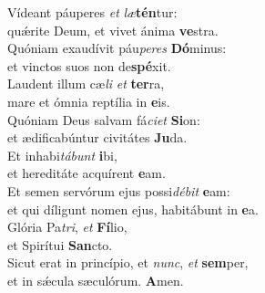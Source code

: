 \oddverse Vídeant páuperes \textit{et} \textit{læ}\textbf{tén}tur:~\*\\
\oddverse quǽrite Deum, et vivet ánima \textbf{ve}stra.\\
\evenverse Quóniam exaudívit páu\textit{pe}\textit{res} \textbf{Dó}minus:~\*\\
\evenverse et vinctos suos non de\textbf{spé}xit.\\
\oddverse Laudent illum cæ\textit{li} \textit{et} \textbf{ter}ra,~\*\\
\oddverse mare et ómnia reptília in \textbf{e}is.\\
\evenverse Quóniam Deus salvam fá\textit{ci}\textit{et} \textbf{Si}on:~\*\\
\evenverse et ædificabúntur civitátes \textbf{Ju}da.\\
\oddverse Et inhabi\textit{tá}\textit{bunt} \textbf{i}bi,~\*\\
\oddverse et hereditáte acquírent \textbf{e}am.\\
\evenverse Et semen servórum ejus possi\textit{dé}\textit{bit} \textbf{e}am:~\*\\
\evenverse et qui díligunt nomen ejus, habitábunt in \textbf{e}a.\\
\oddverse Glória Pa\textit{tri}, \textit{et} \textbf{Fí}lio,~\*\\
\oddverse et Spirítui \textbf{San}cto.\\
\evenverse Sicut erat in princípio, et \textit{nunc}, \textit{et} \textbf{sem}per,~\*\\
\evenverse et in sǽcula sæculórum. \textbf{A}men.\\
